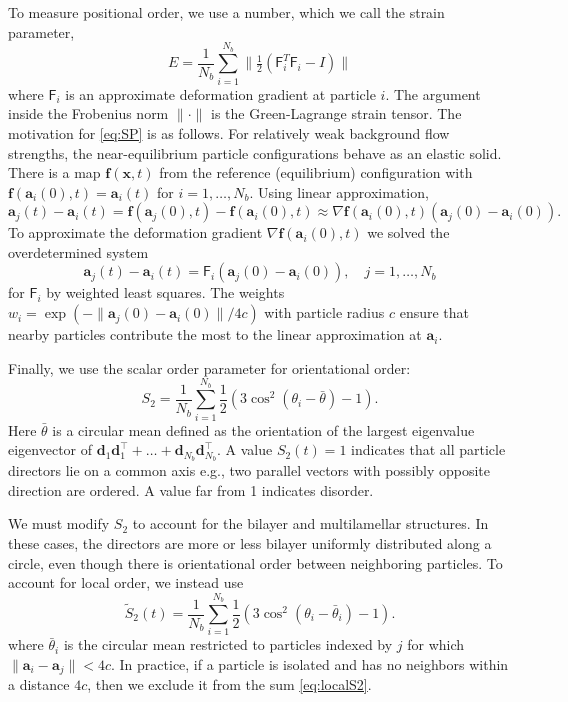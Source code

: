 \documentclass[aps,prl,preprint,groupedaddress]{revtex4-2}
\renewcommand{\aa}{\mathbf{a}}
\newcommand{\dd}{\mathbf{d}}
\newcommand{\ff}{\mathbf{f}}
\newcommand{\xx}{\mathbf{x}}
\begin{document}
To measure positional order, we use a number,
which we call the strain parameter, 
\begin{equation}
\label{eq:SP}
E = \frac{1}{N_b} \sum_{i=1}^{N_b}
\|\tfrac{1}{2}(\mathsf{F}_i^T \mathsf{F}_i - I)\|
\end{equation}
where $\mathsf{F}_i$ is an 
approximate deformation gradient at particle $i$.
The argument inside the Frobenius norm $\| \cdot \|$
is the Green-Lagrange strain tensor.
The motivation for  \eqref{eq:SP} is as follows.
For relatively weak background flow strengths, the near-equilibrium particle
configurations behave as an elastic solid.  There is a map $\ff(\xx,t)$
from the reference (equilibrium) configuration with $\ff(\aa_i(0),t) = \aa_i(t)$
for $i = 1,\dots,N_b$.  Using linear approximation,
\[
\aa_j(t) - \aa_i(t) = \ff(\aa_j(0),t) - \ff(\aa_i(0),t)
\approx \nabla \ff(\aa_i(0),t)(\aa_j(0) - \aa_i(0)).
\]
To approximate
the deformation gradient $\nabla \ff(\aa_i(0),t)$
we solved the overdetermined system 
\[
\aa_j(t) - \aa_i(t) = \mathsf{F}_i(\aa_j(0) - \aa_i(0)),\quad j = 1,\dots, N_b  
\]
for $\mathsf{F}_i$ by weighted least squares. The weights  
$w_i = \exp(-\|\aa_j(0) - \aa_i(0)\|/4c)$ with particle radius $c$
ensure that nearby particles contribute the most to the linear approximation at $\aa_i$. 

Finally, we use the scalar order parameter for orientational order:
\begin{equation}
  \label{eq:S2}
S_2 = \frac{1}{N_b} \sum_{i=1}^{N_b} \frac{1}{2}(3\cos^2(\theta_i - \bar \theta) - 1).
\end{equation}
Here $\bar \theta$ is a circular mean defined as the
orientation of the largest eigenvalue eigenvector of 
$\dd_1\dd_1^\top + \dots + \dd_{N_b}\dd_{N_b}^\top$.
A value $S_2(t) = 1$ indicates 
that all particle directors lie on a common axis e.g.,
two parallel vectors with possibly opposite direction are ordered. 
A value far from 1 indicates disorder.

We must modify $S_2$ to account for the bilayer and
multilamellar structures.  In these cases, the directors 
are more or less bilayer uniformly distributed along a circle, even though
there is orientational order between neighboring particles.
To account for local order, we instead use
\begin{equation}
  \label{eq:localS2}
\tilde{S}_2(t) = \frac{1}{N_b} \sum_{i=1}^{N_b}
\frac{1}{2}(3\cos^2(\theta_i - \bar \theta_i) - 1).
\end{equation}
where $\bar \theta_i$ is the circular mean restricted to particles
indexed by $j$ for which $\|\aa_i - \aa_j\| < 4c$. In practice, if a particle is
isolated and has no neighbors within a distance $4c$, then we exclude it from
the sum \eqref{eq:localS2}. 
\end{document}
